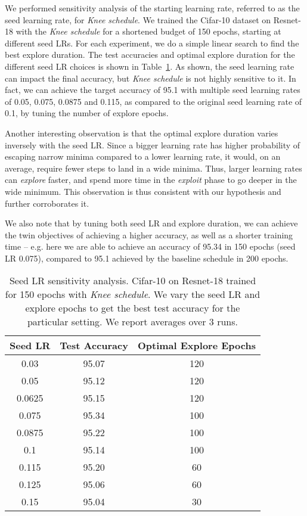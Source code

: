 \documentclass{article} \usepackage{iclr2021_conference,times}
\newcommand{\lrschedule}{\textit{Knee schedule}}
\begin{document}
We performed sensitivity analysis of the starting learning rate, referred to as the seed learning rate, for \lrschedule{}. We trained the Cifar-10 dataset on Resnet-18 with the \lrschedule{} for a shortened budget of 150 epochs, starting at different seed LRs. For each experiment, we do a simple linear search to find the best explore duration. The test accuracies and optimal explore duration for the different seed LR choices is shown in Table~\ref{tab:seed_senstivity_cifar}. As shown, the seed learning rate can impact the final accuracy, but \lrschedule{} is not highly sensitive to it. In fact, we can achieve the target accuracy of 95.1 with multiple seed learning rates of 0.05, 0.075, 0.0875 and 0.115, as compared to the original seed learning rate of 0.1, by tuning the number of explore epochs.

Another interesting observation is that the optimal explore duration varies inversely with the seed LR. Since a bigger learning rate has higher probability of escaping narrow minima compared to a lower learning rate, it would, on an average, require fewer steps to land in a wide minima. Thus, larger learning rates can \textit{explore} faster, and spend more time in the \textit{exploit} phase to go deeper in the wide minimum. This observation is thus consistent with our hypothesis and further corroborates it.

We also note that by tuning both seed LR and explore duration, we can achieve the twin objectives of achieving a higher accuracy, as well as a shorter training time -- e.g. here we are able to achieve an accuracy of 95.34 in 150 epochs (seed LR 0.075), compared to 95.1 achieved by the baseline schedule in 200 epochs.

\begin{table}[h]
\small
\centering
\caption{Seed LR sensitivity analysis. Cifar-10 on Resnet-18 trained for 150 epochs with \lrschedule{}. We vary the seed LR and explore epochs to get the best test accuracy for the particular setting. We report averages over 3 runs.}
\label{tab:seed_senstivity_cifar}

\begin{tabular}{ccc}
  \toprule
  Seed LR        &  Test Accuracy & Optimal Explore Epochs   \\
\midrule
  0.03   & 95.07 & 120\\ 
  0.05   & 95.12 & 120 \\ 
  0.0625    & 95.15 & 120\\ 
  0.075   & 95.34 & 100 \\ 
  0.0875   & 95.22 & 100\\ 
  0.1 & 95.14 & 100 \\
  0.115   & 95.20 & 60\\ 
  0.125   & 95.06 & 60 \\ 
  0.15   & 95.04 & 30 \\ 
 \bottomrule
\end{tabular}

\end{table}
\end{document}
